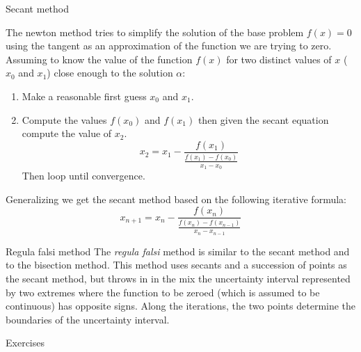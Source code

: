 \documentclass[xcolor={dvipsnames,rgb}, aspectratio=169]{beamer}
\begin{document}
\begin{frame}{Secant method}
   \vspace{-.5cm}
   \small{
      The newton method tries to simplify the solution of the base problem $f(x) = 0$ using
      the tangent as an approximation of the function we are trying to zero. Assuming to
      know the value of the function $f(x)$ for two distinct values of $x$ ($x_0$ and $x_1$)
      close enough to the solution $\alpha$:
      \begin{enumerate}
         \item Make a reasonable first guess $x_{0}$ and $x_{1}$.
         \item Compute the values $f(x_0)$ and $f(x_1)$ then given the secant equation
            compute the value of $x_2$.
            \begin{equation*}
               x_2 = x_1 - \frac{f(x_1)}{\frac{f(x_1) - f(x_0)}{x_1 - x_0}}
            \end{equation*}
            Then loop until convergence.
      \end{enumerate}
      Generalizing we get the \alert{secant method} based on the following iterative
      formula:
      \begin{equation*}
         x_{n+1} = x_{n} - \frac{f(x_{n})}{\frac{f(x_n) - f(x_{n-1})}{x_n - x_{n-1}}}
      \end{equation*}
   }
\end{frame}

\begin{frame}{Regula falsi method}
   The {\it regula falsi} method is similar to the secant method and to the bisection
   method. This method uses secants and a succession of points as the secant method, but
   throws in in the mix the uncertainty interval represented by two extremes where the
   function to be zeroed (which is assumed to be continuous) has opposite signs. Along the
   iterations, the two points determine the boundaries of the uncertainty interval.
\end{frame}

{%
   \begin{frame}[standout]
	   Exercises
   \end{frame}
}
\end{document}
